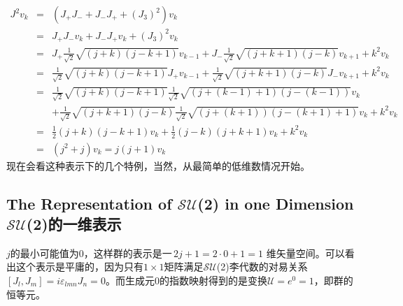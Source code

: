 \begin{eqnarray}
  \nonumber  J^2 v_k&=&(J_+J_- + J_-J_+ +(J_3)^2)v_k \\
  \nonumber         &=&J_+J_-v_k + J_-J_+v_k +(J_3)^2v_k \\
  \nonumber         &=& J_+ \frac{1}{\sqrt{2}}\sqrt{(j+k)(j-k+1)} v_{k-1}+J_-\frac{1}{\sqrt{2}}\sqrt{(j+k+1)(j-k)} v_{k+1} +k^2v_k  \\
  \nonumber         &=& \frac{1}{\sqrt{2}}\sqrt{(j+k)(j-k+1)} J_+v_{k-1}+\frac{1}{\sqrt{2}}\sqrt{(j+k+1)(j-k)}J_- v_{k+1} +k^2v_k  \\
  \nonumber         &=& \frac{1}{\sqrt{2}}\sqrt{(j+k)(j-k+1)}   \frac{1}{\sqrt{2}}  \sqrt{(j+(k-1)+1)(j-(k-1))}v_{k}   \\
  \nonumber          && +\frac{1}{\sqrt{2}}\sqrt{(j+k+1)(j-k)} \frac{1}{\sqrt{2}} \sqrt{(j+(k+1))(j-(k+1)+1)} v_{k} +k^2v_k  \\
   \nonumber        &=&\frac{1}{2}(j+k)(j-k+1)v_k +\frac{1}{2}(j-k)(j+k+1)v_k+k^2v_k\\
\label{equ3.112}
                    &=&(j^2+j)v_k=j(j+1)v_k
\end{eqnarray}
现在会看这种表示下的几个特例，当然，从最简单的低维数情况开始。

\subsection[$\mathcal{SU}$(2)的一维表示]{The Representation of $\mathcal{SU}$(2) in one Dimension $\mathcal{SU}$(2)的一维表示}
\label{sec3.6.3}
$j$的最小可能值为0，这样群的表示是一$\,2j+1=2 \cdot 0+1=1$ 维矢量空间。可以看出这个表示是平庸的，因为只有$1 \times 1$矩阵满足$\mathcal{SU}$(2)李代数的对易关系$[J_l,J_m]=i\varepsilon_{lmn} J_n=0$。而生成元0的指数映射得到的是变换$\mathcal{U}=e^0=1$，即群的恒等元。


